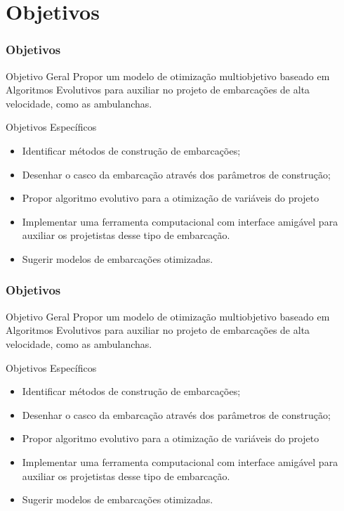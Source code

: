 \documentclass{beamer}
\begin{document}
\section{Objetivos}
\begin{frame}
\tableofcontents[ 
    currentsubsection, 
    hideothersubsections, 
    sectionstyle=show/shaded
    ] 
\end{frame}
\begin{frame}
\frametitle{Objetivos}
\large
\begin{block}{Objetivo Geral}
Propor um modelo de otimização multiobjetivo baseado em Algoritmos Evolutivos para auxiliar no projeto de embarcações de alta velocidade, como as ambulanchas.
\end{block}
\pause
\begin{block}{Objetivos Específicos}
\begin{itemize}
\item Identificar métodos de construção de embarcações;
\item Desenhar o casco da embarcação através dos parâmetros de construção;
\item Propor algoritmo evolutivo para a otimização de variáveis do projeto
\item Implementar uma ferramenta computacional com interface amigável para auxiliar os projetistas desse tipo de embarcação.
\item Sugerir modelos de embarcações otimizadas.
\end{itemize}

\end{block}
\end{frame}
\begin{frame}
\frametitle{Objetivos}
\large
\begin{block}{Objetivo Geral}
	Propor um modelo de otimização multiobjetivo baseado em Algoritmos Evolutivos para auxiliar no projeto de embarcações de alta velocidade, como as ambulanchas.
\end{block}
\begin{block}{Objetivos Específicos}
	\begin{itemize}
		\item \alert{Identificar métodos de construção de embarcações;}
		\item \alert{Desenhar o casco da embarcação através dos parâmetros de construção;}
		\item Propor algoritmo evolutivo para a otimização de variáveis do projeto
		\item Implementar uma ferramenta computacional com interface amigável para auxiliar os projetistas desse tipo de embarcação.
		\item Sugerir modelos de embarcações otimizadas.
	\end{itemize}
	
\end{block}
\end{frame}
\end{document}
